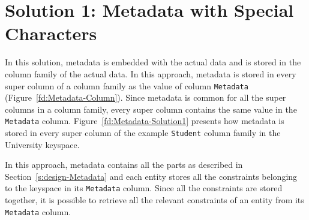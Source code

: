 
\section{Solution 1:  Metadata with Special Characters} \label{s:design-sol1}

In this  solution,   metadata is embedded with the actual data and is
stored in the column family of the actual data.  In this approach,  metadata is
stored in every super column of a column family  as the value of column
\texttt{Metadata} (Figure~\ref{fd:Metadata-Column}).  Since metadata is
common for all the super columns in a column family,  every super column
contains the same  value in the \texttt{Metadata} column. 
Figure~\ref{fd:Metadata-Solution1} presents how metadata is stored in every
super column of the example \texttt{Student} column family in the University
keyspace. 
	
 
		
In this approach,  metadata contains all the parts as
described in Section~\ref{s:design-Metadata} and each entity stores all the
constraints belonging to the keyspace in its \texttt{Metadata} column. Since all
the constraints are stored together, it is possible to retrieve all the relevant
constraints of an entity from its \texttt{Metadata} column.
		

